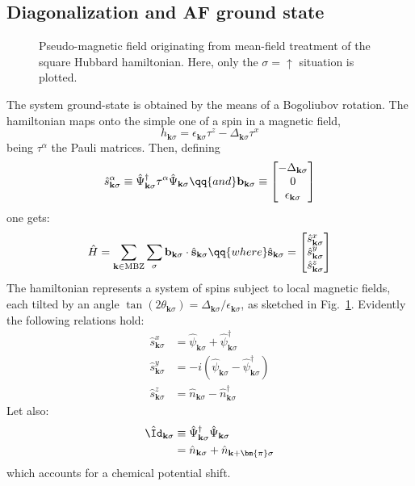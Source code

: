 \subsection{Diagonalization and AF ground state}

\begin{figure}
	\centering
	\caption{Pseudo-magnetic field originating from mean-field treatment of the square Hubbard hamiltonian. Here, only the $\sigma=\uparrow$ situation is plotted.}
	\label{appfig:pseudo-magnetic-field}
\end{figure}

The system ground-state is obtained by the means of a Bogoliubov rotation. The hamiltonian maps onto the simple one of a spin in a magnetic field,
\[
	h_{\mathbf{k}\sigma} = \epsilon_{\mathbf{k}\sigma} \tau^z - \Delta_{\mathbf{k}\sigma} \tau^x
\]
being $\tau^\alpha$ the Pauli matrices. Then, defining
\[
	\hat s_{\mathbf{k}\sigma}^\alpha \equiv \hat \Psi_{\mathbf{k}\sigma}^\dagger \tau^\alpha \hat \Psi_{\mathbf{k}\sigma}
	\qq{and}
	\mathbf{b}_{\mathbf{k}\sigma} \equiv \begin{bmatrix}
		-\Delta_{\mathbf{k}\sigma} \\ 0 \\ \epsilon_{\mathbf{k}\sigma} 
	\end{bmatrix}
\]
one gets:
\begin{equation}\label{appeq:hubbard-bogoliubov-hamiltonian-pseudofields}
	\hat H = \sum_{\mathbf{k} \in \mathrm{MBZ}} \sum_\sigma \mathbf{b}_{\mathbf{k}\sigma} \cdot \hat{\mathbf{s}}_{\mathbf{k}\sigma}
	\qq{where}
	\hat{\mathbf{s}}_{\mathbf{k}\sigma} = \begin{bmatrix}
		\hat s_{\mathbf{k}\sigma}^x \\
		\hat s_{\mathbf{k}\sigma}^y \\
		\hat s_{\mathbf{k}\sigma}^z
	\end{bmatrix}
\end{equation}
The hamiltonian represents a system of spins subject to local magnetic fields, each tilted by an angle $\tan(2\theta_{\mathbf{k}\sigma}) = \Delta_{\mathbf{k}\sigma}/\epsilon_{\mathbf{k}\sigma}$, as sketched in Fig.~\ref{appfig:pseudo-magnetic-field}. Evidently the following relations hold:
\begin{align}
	\hat s_{\mathbf{k}\sigma}^x &= \hat \psi_{\mathbf{k}\sigma} + \hat \psi_{\mathbf{k}\sigma}^\dagger \label{appeq:af-hm-x-psi} \\
	\hat s_{\mathbf{k}\sigma}^y &= -i \left(
		\hat \psi_{\mathbf{k}\sigma} - \hat \psi_{\mathbf{k}\sigma}^\dagger 
	\right) \label{appeq:af-hm-y-psi} \\
	\hat s_{\mathbf{k}\sigma}^z &= \hat n_{\mathbf{k}\sigma} - \hat n_{\mathbf{k}\sigma}^\dagger \label{appeq:af-hm-z-psi} 
\end{align}
Let also:
\begin{align}
	\hat \Id_{\mathbf{k}\sigma} &\equiv \hat \Psi_{\mathbf{k}\sigma}^\dagger \hat \Psi_{\mathbf{k}\sigma} \nonumber \\
	&= \hat n_{\mathbf{k}\sigma} + \hat n_{\mathbf{k}+\bm{\pi}\sigma} \label{appeq:af-hm-id-def}
\end{align}
which accounts for a chemical potential shift.

